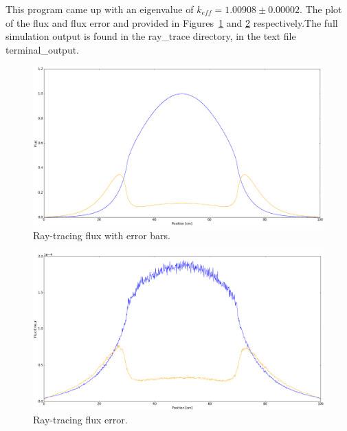 \documentclass{article}
\begin{document}
	This program came up with an eigenvalue of $k_{eff} = 1.00908 \pm 0.00002$. The plot of the flux and flux error and provided in Figures~\ref{fig:rt_flux} and \ref{fig::rt_flux_erreur} respectively.The full simulation output is found in the ray\_trace directory, in the text file terminal\_output.
	
	
	\begin{figure}
		\centering
		\includegraphics[scale=0.35]{rt_flux.png}
		\caption{Ray-tracing flux with error bars.}
		\label{fig:rt_flux}
	\end{figure}
	\begin{figure}
		\centering
		\includegraphics[scale=0.35]{rt_flux_erreur.png}
		\caption{Ray-tracing flux error.}
		\label{fig::rt_flux_erreur}
	\end{figure}
	
\end{document}
